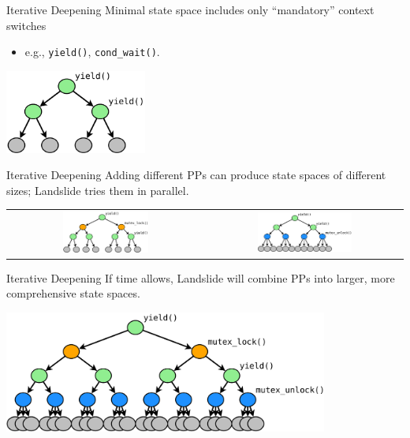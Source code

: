 \documentclass[xcolor=dvipsnames]{beamer}
\begin{document}
\begin{frame}{Iterative Deepening}
	Minimal state space includes only ``mandatory'' context switches
	\begin{itemize}
		\item e.g., {\tt yield()}, {\tt cond\_wait()}.
	\end{itemize}
	\vspace{0.29in}
	\begin{center}
		\includegraphics[width=0.35\textwidth]{tree0.pdf}
	\end{center}
\end{frame}

\begin{frame}{Iterative Deepening}
	Adding different PPs can produce state spaces of different sizes; Landslide tries them in parallel.
	\vspace{0.15in}
	\begin{center}
		\begin{tabular}{cc}
			\includegraphics[width=0.45\textwidth]{tree1.pdf} &
			\includegraphics[width=0.5\textwidth]{tree2.pdf}
		\end{tabular}
	\end{center}
\end{frame}


\begin{frame}{Iterative Deepening}
	If time allows, Landslide will combine PPs into larger, more comprehensive state spaces.
	\begin{center}
		\includegraphics[width=0.8\textwidth]{tree3.pdf}
	\end{center}
\end{frame}
\end{document}
